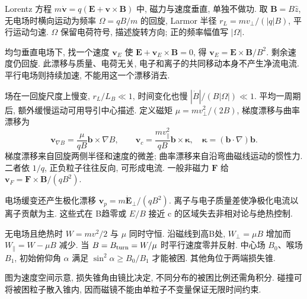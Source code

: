 \label{ch:orbits}
Lorentz 方程 $m\dot{\mathbf v}=q(\mathbf E+\mathbf v\times\mathbf B)$ 中, 磁力与速度垂直, 单独不做功. 取 $\mathbf B=B\hat z$, 无电场时横向运动为频率 $\Omega=qB/m$ 的回旋, Larmor 半径 $r_L=mv_\perp/(|q|B)$, 平行运动匀速. $\Omega$ 保留电荷符号, 描述旋转方向; 正的频率幅值写 $|\Omega|$.

均匀垂直电场下, 找一个速度 $\mathbf v_E$ 使 $\mathbf E+\mathbf v_E\times\mathbf B=0$, 得 $\mathbf v_E=\mathbf E\times\mathbf B/B^2$. 剩余速度仍回旋. 此漂移与质量、电荷无关, 电子和离子的共同移动本身不产生净流电流. 平行电场则持续加速, 不能用这一个漂移消去.

场在一回旋尺度上慢变, $r_L/L_B\ll1$, 时间变化也慢 $|\dot B|/(B|\Omega|)\ll1$. 平均一周期后, 额外缓慢运动可用导引中心描述. 定义磁矩 $\mu=mv_\perp^2/(2B)$, 梯度漂移与曲率漂移为
\begin{equation}\label{eq:drifts}
 \mathbf v_{\nabla B}=\frac{\mu}{qB}\mathbf b\times\nabla B,
 \qquad\mathbf v_c=\frac{mv_\parallel^2}{qB}\mathbf b\times\boldsymbol\kappa,
 \quad\boldsymbol\kappa=(\mathbf b\cdot\nabla)\mathbf b.
\end{equation}
梯度漂移来自回旋两侧半径和速度的微差; 曲率漂移来自沿弯曲磁线运动的惯性力. 二者依 $1/q$, 正负粒子往往反向, 可形成电流. 一般非磁力 $\mathbf F$ 给 $\mathbf v_F=\mathbf F\times\mathbf B/(qB^2)$.

电场缓变还产生极化漂移 $\mathbf v_p=m\dot{\mathbf E}_\perp/(qB^2)$. 离子与电子质量差使净极化电流以离子贡献为主. 这些式在 B趋零或 $E/B$ 接近 c 的区域失去非相对论与绝热控制.

无电场且绝热时 $W=mv^2/2$ 与 $\mu$ 同时守恒. 沿磁线到高B处, $W_\perp=\mu B$ 增加而 $W_\parallel=W-\mu B$ 减少. 当 $B=B_{
\rm turn}=W/\mu$ 时平行速度零并反射. 中心场 $B_0$、喉场 $B_1$, 初始俯仰角 $\alpha$ 满足 $\sin^2\alpha\ge B_0/B_1$ 才能被困. 其他角位于两端损失锥.

\noindent\begin{minipage}{\linewidth}
\begin{center}\end{center}
图为速度空间示意, 损失锥角由镜比决定, 不同分布的被困比例还需角积分. 碰撞可将被困粒子散入锥内, 因而磁镜不能由单粒子不变量保证无限时间约束.
\end{minipage}

